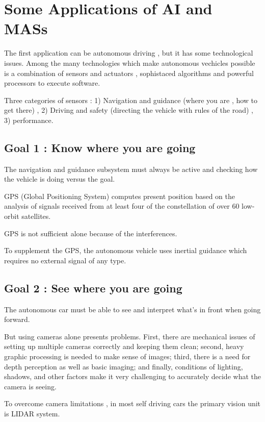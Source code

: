 \documentclass{article}
\begin{document}
\vspace{50mm}

\section{Some Applications of AI and MASs}

The first application can be autonomous driving , but it has some technological issues. Among the many technologies which make autonomous vechicles possible is a combination of sensors and actuators , sophistaced algorithms and powerful processors to execute software.

Three categories of sensors : 1) Navigation and guidance (where you are , how to get there) , 2) Driving and safety (directing the vehicle with rules of the road) , 3) performance.

\subsection{Goal 1 : Know where you are going}


The navigation and guidance subsystem must always be
active and checking how the vehicle is doing versus the
goal.

GPS (Global Positioning System) computes present
position based on the analysis of signals received from at
least four of the constellation of over 60 low-orbit satellites.

GPS is not sufficient alone because of the interferences.


To supplement the GPS, the autonomous vehicle uses inertial guidance
which requires no external signal of any type.

\subsection{Goal 2 : See where you are going}

The autonomous car must be able to see and interpret what's in front
when going forward.

But using cameras alone presents problems. First, there are
mechanical issues of setting up multiple cameras correctly and keeping
them clean; second, heavy graphic processing is needed to make
sense of images; third, there is a need for depth perception as well as
basic imaging; and finally, conditions of lighting, shadows, and other
factors make it very challenging to accurately decide what the camera
is seeing.

To overcome camera limitations , in most self driving cars the primary vision unit is LIDAR system.
\end{document}
